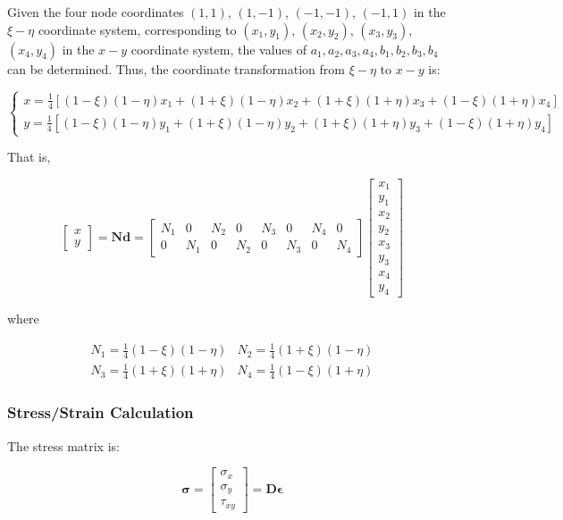 \documentclass{article}
\begin{document}
Given the four node coordinates \((1, 1)\), \((1, -1)\), \((-1, -1)\), \((-1, 1)\) in the \( \xi-\eta \) coordinate system, corresponding to \((x_1, y_1)\), \((x_2, y_2)\), \((x_3, y_3)\), \((x_4, y_4)\) in the \( x-y \) coordinate system, the values of \( a_1, a_2, a_3, a_4, b_1, b_2, b_3, b_4 \) can be determined.
Thus, the coordinate transformation from \( \xi-\eta \) to \( x-y \) is:

\[
\begin{cases}
x = \frac{1}{4} \left[(1 - \xi)(1 - \eta)x_1 + (1 + \xi)(1 - \eta)x_2 + (1 + \xi)(1 + \eta)x_3 + (1 - \xi)(1 + \eta)x_4\right] \\
y = \frac{1}{4} \left[(1 - \xi)(1 - \eta)y_1 + (1 + \xi)(1 - \eta)y_2 + (1 + \xi)(1 + \eta)y_3 + (1 - \xi)(1 + \eta)y_4\right]
\end{cases}
\]

That is,

\[
\begin{bmatrix}
x \\
y
\end{bmatrix} = \mathbf{N} \mathbf{d} =
\begin{bmatrix}
N_1 & 0 & N_2 & 0 & N_3 & 0 & N_4 & 0 \\
0 & N_1 & 0 & N_2 & 0 & N_3 & 0 & N_4
\end{bmatrix}
\begin{bmatrix}
x_1 \\
y_1 \\
x_2 \\
y_2 \\
x_3 \\
y_3 \\
x_4 \\
y_4
\end{bmatrix}
\]

where

\[
\begin{matrix}
N_1 = \frac{1}{4} (1 - \xi)(1 -\eta) & N_2 = \frac{1}{4} (1 + \xi)(1 - \eta) \\
N_3 = \frac{1}{4} (1 + \xi)(1 + \eta) & N_4 = \frac{1}{4} (1 - \xi)(1 + \eta)
\end{matrix}
\]

\subsubsection{Stress/Strain Calculation}

The stress matrix is:

\[
\mathbf{\sigma} = \begin{bmatrix}
\sigma_x \\
\sigma_y \\
\tau_{xy}
\end{bmatrix} = \mathbf{D} \mathbf{\epsilon}
\]
\end{document}
